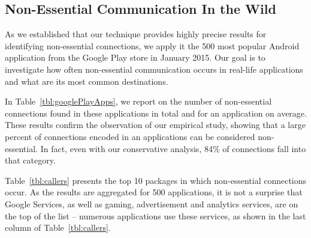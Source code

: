\subsection{Non-Essential Communication In the Wild}
As we established that our technique provides highly precise results for identifying non-essential connections,
we apply it the 500 most popular Android application from the Google Play store in January 2015. 
Our goal is to investigate how often non-essential communication occurs in real-life applications and what are its most common destinations. 

In Table~\ref{tbl:googlePlayApps}, we report on the number of non-essential connections found in these applications in total and for an application on average. 
These results confirm the observation of our empirical study, showing
that a large percent of connections encoded in an applications can be considered non-essential. 
In fact, even with our conservative analysis, 84\% of connections fall into that category. 

Table~\ref{tbl:callers} presents the top 10 packages in which non-essential connections occur.
As the results are aggregated for 500 applications, it is not a surprise that Google Services, as well as gaming, advertisement and analytics services, are on the top of the list -- numerous applications use these services, as shown in the last column of Table~\ref{tbl:callers}. 






